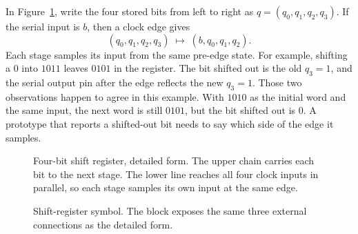In Figure~\ref{fig:sr}, write the four stored bits from left to right as $q=(q_0,q_1,q_2,q_3)$. If the serial input is $b$, then a clock edge gives
\[
(q_0,q_1,q_2,q_3)\;\longmapsto\;(b,q_0,q_1,q_2).
\]
Each stage samples its input from the same pre-edge state. For example, shifting a $0$ into $1011$ leaves $0101$ in the register. The bit shifted out is the old $q_3=1$, and the serial output pin after the edge reflects the new $q_3=1$. Those two observations happen to agree in this example. With $1010$ as the initial word and the same input, the next word is still $0101$, but the bit shifted out is $0$. A prototype that reports a shifted-out bit needs to say which side of the edge it samples.

\begin{figure}[ht]
\centering
{}
\caption{Four-bit shift register, detailed form. The upper chain carries each bit to the next stage. The lower line reaches all four clock inputs in parallel, so each stage samples its own input at the same edge.}
\label{fig:sr}
\end{figure}

\begin{figure}[ht]
\centering
{}
\caption{Shift-register symbol. The block exposes the same three external connections as the detailed form.}
\label{fig:srg}
\end{figure}

